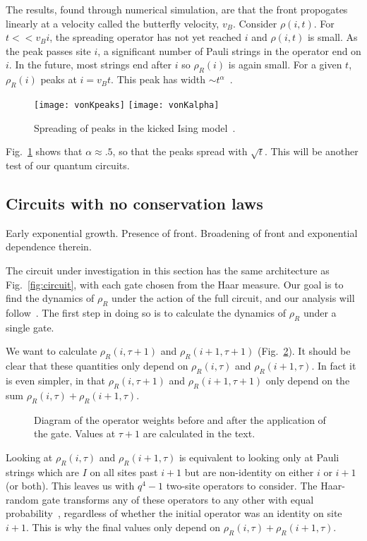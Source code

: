 \documentclass[a4paper,12pt]{article}
\renewcommand{\t}{\tau}
\begin{document}
The results, found through numerical simulation, are that the front propogates linearly at a velocity called the butterfly velocity, $v_B$. Consider $\rho(i,t)$. For $t<<v_B i$, the spreading operator has not yet reached $i$ and $\rho(i,t)$ is small. As the peak passes site $i$, a significant number of Pauli strings in the operator end on $i$. In the future, most strings end after $i$ so $\rho_R(i)$ is again small. For a given $t$, $\rho_R(i)$ peaks at $i=v_B t$. This peak has width $\sim t^\alpha$~\cite{vonKeyserlingkHydro}.
\begin{figure}
	\centering
	\texttt{[image: vonKpeaks]}
	\texttt{[image: vonKalpha]}
	\caption{Spreading of peaks in the kicked Ising model~\cite{vonKeyserlingkHydro}.}
	\label{fig:vonKalpha}
\end{figure}
Fig.~\ref{fig:vonKalpha} shows that $\alpha\approx .5$, so that the peaks spread with $\sqrt{t}$. This will be another test of our quantum circuits.

\subsection{Circuits with no conservation laws} \label{sub:cncons}

Early exponential growth.
Presence of front.
Broadening of front and exponential dependence therein.

The circuit under investigation in this section has the same architecture as Fig.~\ref{fig:circuit}, with each gate chosen from the Haar measure. Our goal is to find the dynamics of $\rho_R$ under the action of the full circuit, and our analysis will follow~\cite{vonKeyserlingkHydro}. The first step in doing so is to calculate the dynamics of $\rho_R$ under a single gate. 

We want to calculate $\rho_R(i,\tau+1)$ and $\rho_R(i+1, \tau+1)$ (Fig.~\ref{fig:2sites}). It should be clear that these quantities only depend on $\rho_R(i,\tau)$ and $\rho_R(i+1, \tau)$. In fact it is even simpler, in that $\rho_R(i,\tau+1)$ and $\rho_R(i+1, \tau+1)$ only depend on the sum $\rho_R(i,\tau) + \rho_R(i+1, \tau)$. 

\begin{figure}
	\centering
	
	\caption{Diagram of the operator weights before and after the application of the gate. Values at $\t+1$ are calculated in the text.}
	\label{fig:2sites}
\end{figure}

Looking at $\rho_R(i,\tau)$ and $\rho_R(i+1, \tau)$ is equivalent to looking only at Pauli strings which are $I$ on all sites past $i+1$ but are non-identity on either $i$ or $i+1$ (or both).
This leaves us with $q^4-1$ two-site operators to consider. The Haar-random gate transforms any of these operators to any other with equal probability~\cite{BrownScrambling}, regardless of whether the initial operator was an identity on site $i+1$. This is why the final values only depend on $\rho_R(i,\tau) + \rho_R(i+1, \tau)$.
\end{document}

